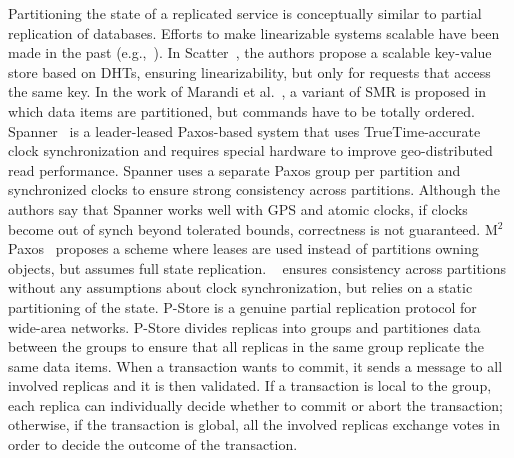 Partitioning the state of a replicated service is conceptually similar to
partial replication of databases. Efforts to make linearizable systems scalable
have been made in the past (e.g.,~\cite{bezerra2014ssmr, corbett2013spanner,
Glendenning:2011kj, Marandi:2011dj}).  In Scatter~\cite{Glendenning:2011kj}, the
authors propose a scalable key-value store based on DHTs, ensuring
linearizability, but only for requests that access the same key. In the work of
Marandi et al.~\cite{Marandi:2011dj}, a variant of SMR is proposed in which data
items are partitioned, but commands have to be totally ordered.
Spanner~\cite{corbett2013spanner} is a leader-leased Paxos-based system that
uses TrueTime-accurate clock synchronization and requires special hardware to
improve geo-distributed read performance. Spanner uses a separate Paxos group
per partition and synchronized clocks to ensure strong consistency across
partitions. Although the authors say that Spanner works well with GPS and atomic
clocks, if clocks become out of synch beyond tolerated bounds, correctness is
not guaranteed. M$^2$Paxos~\cite{7579738} proposes a scheme where leases are
used instead of partitions owning objects, but assumes full state replication.
\ssmr{}~\cite{bezerra2014ssmr} ensures consistency across partitions without any
assumptions about clock synchronization, but relies on a static partitioning of
the state. P-Store \cite{Schiper:2010pstore} is a genuine partial replication
protocol for wide-area networks. P-Store divides replicas into groups and
partitiones data between the groups to ensure that all replicas in the same
group replicate the same data items. When a transaction wants to commit, it sends
a message to all involved replicas and it is then validated. If a transaction is local to the
group, each replica can individually decide whether to commit or abort the transaction;
otherwise, if the transaction is global, all the involved replicas exchange
votes in order to decide the outcome of the transaction.


